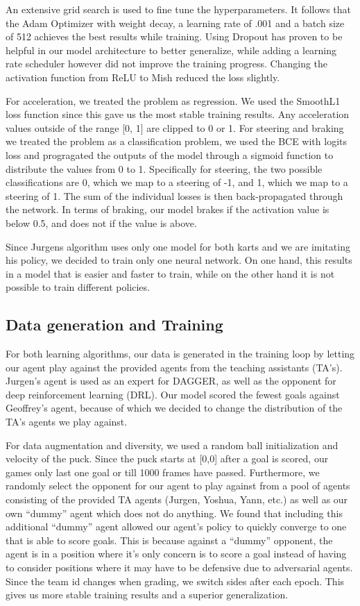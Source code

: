 \documentclass[10pt,twocolumn,letterpaper]{article}
\begin{document}
An extensive grid search is used to fine tune the hyperparameters. It follows that the Adam Optimizer with weight decay, a learning rate of .001 and a batch size of 512 achieves the best results while training. Using Dropout has proven to be helpful in our model architecture to better generalize, while adding a learning rate scheduler however did not improve the training progress. Changing the activation function from ReLU to Mish reduced the loss slightly.

For acceleration, we treated the problem as regression. We used the SmoothL1 loss function since this gave us the most stable training results. Any acceleration values outside of the range [0, 1] are clipped to 0 or 1. For steering and braking we treated the problem as a classification problem, we used the BCE with logits loss and progragated the outputs of the model through a sigmoid function to distribute the values from 0 to 1. Specifically for steering, the two possible classifications are 0, which we map to a steering of -1, and 1, which we map to a steering of 1. The sum of the individual losses is then back-propagated through the network. In terms of braking, our model brakes if the activation value is below 0.5, and does not if the value is above.

Since Jurgens algorithm uses only one model for both karts and we are imitating his policy, we decided to train only one neural network. On one hand, this results in a model that is easier and faster to train, while on the other hand it is not possible to train different policies.

\subsection{Data generation and Training}
For both learning algorithms, our data is generated in the training loop by letting our agent play against the provided agents from the teaching assistants (TA’s). Jurgen’s agent is used as an expert for DAGGER, as well as the opponent for deep reinforcement learning (DRL). Our model scored the fewest goals against Geoffrey’s agent, because of which we decided to change the distribution of the TA’s agents we play against.

For data augmentation and diversity, we used a random ball initialization and velocity of the puck. Since the puck starts at [0,0] after a goal is scored, our games only last one goal or till 1000 frames have passed. Furthermore, we randomly select the opponent for our agent to play against from a pool of agents consisting of the provided TA agents (Jurgen, Yoshua, Yann, etc.) as well as our own “dummy” agent which does not do anything. We found that including this additional “dummy” agent allowed our agent’s policy to quickly converge to one that is able to score goals. This is because against a “dummy” opponent, the agent is in a position where it’s only concern is to score a goal instead of having to consider positions where it may have to be defensive due to adversarial agents. Since the team id changes when grading, we switch sides after each epoch. This gives us more stable training results and a superior generalization.
\end{document}

